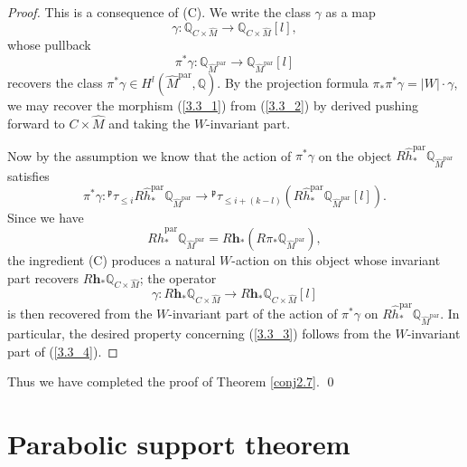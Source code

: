 \documentclass[11pt]{amsart}
\theoremstyle{plain}
\theoremstyle{definition}
\theoremstyle{remark}
\newcommand{\BQ}{{\mathbb{Q}}}
\begin{document}
\begin{proof}
    This is a consequence of (C). We write the class $\gamma$ as a map 
    \begin{equation}\label{3.3_1}
\gamma: \BQ_{C\times \widehat{M}} \to \BQ_{C\times \widehat{M}}[l],   
\end{equation}
whose pullback 
\begin{equation}\label{3.3_2}
\pi^*\gamma: \BQ_{\widehat{M}^{\mathrm{par}}} \to  \BQ_{\widehat{M}^{\mathrm{par}}}[l]
\end{equation}
recovers the class $\pi^*\gamma \in H^l(\widehat{M}^{\mathrm{par}}, \BQ)$. By the projection formula $\pi_*\pi^*\gamma = |W|\cdot \gamma$, we may recover the morphism (\ref{3.3_1}) from (\ref{3.3_2}) by derived pushing forward to $C \times \widehat{M}$ and taking the $W$-invariant part.

Now by the assumption we know that the action of $\pi^*\gamma$ on the object $R\widehat{h}^{\mathrm{par}}_*\BQ_{\widehat{M}^{\mathrm{par}}}$ satisfies
\begin{equation}\label{3.3_4}
\pi^*\gamma: {^\mathfrak{p}\tau_{\leq i}}R\widehat{h}^{\mathrm{par}}_*\BQ_{\widehat{M}^{\mathrm{par}}} \to {^\mathfrak{p}\tau_{\leq i+(k-l)}}\left(R\widehat{h}^{\mathrm{par}}_*\BQ_{\widehat{M}^{\mathrm{par}}}[l]\right).
\end{equation}
Since we have
\[
R\widehat{h}^{\mathrm{par}}_*\BQ_{\widehat{M}^{\mathrm{par}}} = R\mathbf{h}_*\left(R\pi_* \BQ_{\widehat{M}^{\mathrm{par}}}\right),
\] 
the ingredient (C) produces a natural $W$-action on this object whose invariant part recovers $R\mathbf{h}_*\BQ_{C\times \widehat{M}}$; the operator
\begin{equation}\label{3.3_3}
\gamma:  R\mathbf{h}_*\BQ_{C\times \widehat{M}} \to R\mathbf{h}_*\BQ_{C\times \widehat{M}}[l]  
\end{equation}
is then recovered from the $W$-invariant part of the action of $\pi^*\gamma$ on $R\widehat{h}^{\mathrm{par}}_*\BQ_{\widehat{M}^{\mathrm{par}}}$. In particular, the desired property concerning (\ref{3.3_3}) follows from the $W$-invariant part of (\ref{3.3_4}).
\end{proof}




Thus we have completed the proof of Theorem \ref{conj2.7}. \qed






\section{Parabolic support theorem}
\end{document}
